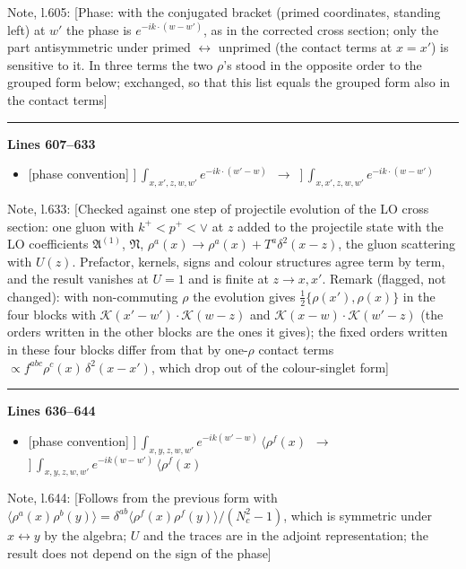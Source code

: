 \documentclass[10pt]{article}
\newenvironment{notebox}{\def\FrameCommand{{\color{notebar}\vrule width 1.5pt}\hspace{6pt}}\MakeFramed{\advance\hsize-\width\FrameRestore}\small}{\endMakeFramed}
\begin{document}
\begin{notebox}\textsf{\small Note, l.605:} [Phase: with the conjugated bracket (primed coordinates, standing left) at $w'$ the phase is $e^{-ik\cdot(w-w')}$, as in the corrected cross section; only the part antisymmetric under primed $\leftrightarrow$ unprimed (the contact terms at $x=x'$) is sensitive to it. In three terms the two $\rho$'s stood in the opposite order to the grouped form below; exchanged, so that this list equals the grouped form also in the contact terms]\end{notebox}
\noindent\rule{\linewidth}{0.3pt}\par\noindent\textbf{Lines 607--633} \par
\begin{itemize}[leftmargin=2.2em,itemsep=1pt,topsep=2pt]
\item[\textbf{l.607}] \textsf{\small [phase convention]} $\displaystyle \Big]\,\int_{x,x',z,w,w'}e^{-ik\cdot(w'-w)}$\ $\longrightarrow$\ $\displaystyle \Big]\,\int_{x,x',z,w,w'}e^{-ik\cdot(w-w')}$
\end{itemize}
\begin{notebox}\textsf{\small Note, l.633:} [Checked against one step of projectile evolution of the LO cross section: one gluon with $k^{+}<p^{+}<\vee$ at $z$ added to the projectile state with the LO coefficients $\mathfrak{A}^{(1)}$, $\mathfrak{N}$, $\rho^{a}(x)\to\rho^{a}(x)+T^{a}\delta^{2}(x-z)$, the gluon scattering with $U(z)$. Prefactor, kernels, signs and colour structures agree term by term, and the result vanishes at $U=1$ and is finite at $z\to x,x'$. Remark (flagged, not changed): with non-commuting $\rho$ the evolution gives $\tfrac12\{\rho(x'),\rho(x)\}$ in the four blocks with $\mathcal{K}(x'-w')\cdot\mathcal{K}(w-z)$ and $\mathcal{K}(x-w)\cdot\mathcal{K}(w'-z)$ (the orders written in the other blocks are the ones it gives); the fixed orders written in these four blocks differ from that by one-$\rho$ contact terms $\propto f^{abc}\rho^{c}(x)\,\delta^{2}(x-x')$, which drop out of the colour-singlet form]\end{notebox}
\noindent\rule{\linewidth}{0.3pt}\par\noindent\textbf{Lines 636--644} \par
\begin{itemize}[leftmargin=2.2em,itemsep=1pt,topsep=2pt]
\item[\textbf{l.636}] \textsf{\small [phase convention]} $\displaystyle \Big]\,\int_{x,y,z,w,w'}e^{-ik(w'-w)}\,\langle\rho^{f}(x)$\ $\longrightarrow$\ $\displaystyle \Big]\,\int_{x,y,z,w,w'}e^{-ik(w-w')}\,\langle\rho^{f}(x)$
\end{itemize}
\begin{notebox}\textsf{\small Note, l.644:} [Follows from the previous form with $\langle\rho^{a}(x)\rho^{b}(y)\rangle=\delta^{ab}\langle\rho^{f}(x)\rho^{f}(y)\rangle/(N_c^{2}-1)$, which is symmetric under $x\leftrightarrow y$ by the algebra; $U$ and the traces are in the adjoint representation; the result does not depend on the sign of the phase]\end{notebox}
\bigskip
\end{document}
